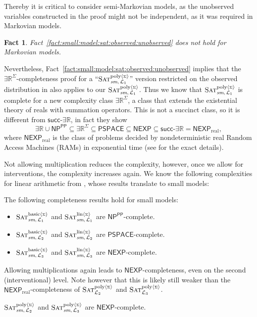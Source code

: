 \documentclass[a4paper,UKenglish,cleveref, autoref, thm-restate]{lipics-v2021}
\newtheorem{fact}[equation]{Fact}
\newcommand{\IR}{\mathbb{R}}
\newcommand{\existsR}{\ensuremath{\mathsf{\exists\IR}}}
\newcommand{\succR}{\ensuremath{\mathsf{succ\text{-}\exists\IR}}}
\newcommand{\NP}{\ensuremath{\mathsf{NP}}}
\newcommand{\NEXP}{\ensuremath{\mathsf{NEXP}}}
\newcommand{\realNEXP}{\ensuremath{\mathsf{NEXP}_{\text{real}}}}
\newcommand{\PSPACE}{\ensuremath{\mathsf{PSPACE}}}
\newcommand{\ccPP}{\ensuremath{\mathsf{PP}}}
\def\probsumname#1#2{^{\text{#1}{\langle{\scriptscriptstyle\Sigma}\rangle}}_{\text{#2}}}
\newcommand{\SATinterventpolysum}{\mbox{\sc Sat}\probsumname{poly}{${\cal L}_2$}}
\newcommand{\SATcausalpolysum}{\mbox{\sc Sat}\probsumname{poly}{${\cal L}_3$}}
\newcommand{\SATprobpolysumsm}{\mbox{\sc Sat}\probsumname{poly}{\textit{sm},\,${\cal L}_1$}}
\newcommand{\SATinterventpolysumsm}{\mbox{\sc Sat}\probsumname{poly}{\textit{sm},\,${\cal L}_2$}}
\newcommand{\SATcausalpolysumsm}{\mbox{\sc Sat}\probsumname{poly}{\textit{sm},\,${\cal L}_3$}}
\newcommand{\SATproblinsumsm}{\mbox{\sc Sat}\probsumname{lin}{\textit{sm},\,${\cal L}_1$}}
\newcommand{\SATinterventlinsumsm}{\mbox{\sc Sat}\probsumname{lin}{\textit{sm},\,${\cal L}_2$}}
\newcommand{\SATcausallinsumsm}{\mbox{\sc Sat}\probsumname{lin}{\textit{sm},\,${\cal L}_3$}}
\newcommand{\SATprobcompsumsm}{\mbox{\sc Sat}\probsumname{basic}{\textit{sm},\,${\cal L}_1$}}
\newcommand{\SATinterventcompsumsm}{\mbox{\sc Sat}\probsumname{basic}{\textit{sm},\,${\cal L}_2$}}
\newcommand{\SATcausalcompsumsm}{\mbox{\sc Sat}\probsumname{basic}{\textit{sm},\,${\cal L}_3$}}
\newenvironment{compactitem}{\begin{itemize}}{\end{itemize}}
\begin{document}
Thereby it is critical to consider semi-Markovian models, as the unobserved variables constructed in the proof might not be independent, as it was required in Markovian models. 

\begin{fact}\label{fact:small:model:sat:not:Markovian}
Fact~\ref{fact:small:model:sat:observed:unobserved} does not hold for Markovian models. \end{fact}



Nevertheless, Fact~\ref{fact:small:model:sat:observed:unobserved} implies that the $\existsR^\Sigma$-completeness proof for a ``$\SATprobpolysumsm$'' version restricted on the observed distribution in \citep{blaser2024existential} also applies to our $\SATprobpolysumsm$. 
Thus we know that $\SATprobpolysumsm$ is complete for a new complexity 
class $\existsR^\Sigma$, a class that extends the existential theory of reals with summation operators. 
This is not a succinct class, so it is different from $\succR$, in fact they show
$$\existsR \cup \NP^{\ccPP}  \subseteq \existsR^\Sigma \subseteq \PSPACE \subseteq \NEXP \subseteq \succR = \realNEXP,$$
where $\realNEXP$ is the class of problems decided by nondeterministic real 
Random Access Machines (RAMs) in  
exponential time (see   \citep{blaser2024existential} for the exact details). 


Not allowing multiplication reduces the complexity, however, once we allow for interventions, the complexity increases again. We know the following complexities for linear arithmetic from \citep{doerflerICLR2025}, whose results translate to small models:
 
\begin{lemma}
    \label{lemma:small:model:in:linear}
    The following completeness results hold for small models:
    \begin{compactitem}
        \item $\SATprobcompsumsm$ and $\SATproblinsumsm$ are $\NP^{\ccPP}$-complete.
        \item $\SATinterventcompsumsm$ and $\SATinterventlinsumsm$ are $\PSPACE$-complete.
        \item $\SATcausalcompsumsm$ and $\SATcausallinsumsm$ are $\NEXP$-complete.
    \end{compactitem}
\end{lemma}

Allowing multiplications again leads to $\NEXP$-completeness, even on the second (interventional) level.
Note however that this is likely still weaker than the $\realNEXP$-completeness 
of $\SATinterventpolysum$ and $\SATcausalpolysum$.
\begin{theorem}\label{lab:lemma:interv:counter:smconj}
	$\SATinterventpolysumsm$ and $\SATcausalpolysumsm$ are $\NEXP$-complete.
\end{theorem}
\end{document}
